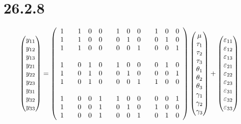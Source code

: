 \section*{26.2.8}
$$\left(\begin{matrix}
y_{11}\cr
y_{12}\cr
y_{13}\cr
y_{21}\cr
y_{22}\cr
y_{23}\cr
y_{31}\cr
y_{32}\cr
y_{33}
\end{matrix}\right)=\left(\begin{array}{ccccccccccccc}
1 && 1 & 0 & 0 && 1 & 0 & 0 && 1 & 0 & 0\cr
1 && 1 & 0 & 0 && 0 & 1 & 0 && 0 & 1 & 0\cr
1 && 1 & 0 & 0 && 0 & 0 & 1 && 0 & 0 & 1\cr
\cr
1 && 0 & 1 & 0 && 1 & 0 & 0 && 0 & 1 & 0\cr
1 && 0 & 1 & 0 && 0 & 1 & 0 && 0 & 0 & 1\cr
1 && 0 & 1 & 0 && 0 & 0 & 1 && 1 & 0 & 0\cr
\cr
1 && 0 & 0 & 1 && 1 & 0 & 0 && 0 & 0 & 1\cr
1 && 0 & 0 & 1 && 0 & 1 & 0 && 1 & 0 & 0\cr
1 && 0 & 0 & 1 && 0 & 0 & 1 && 0 & 1 & 0\cr
\end{array}\right)\left(\begin{matrix}
\mu\cr
\tau_1\cr
\tau_2\cr
\tau_3\cr
\theta_1\cr
\theta_2\cr
\theta_3\cr
\gamma_1\cr
\gamma_2\cr
\gamma_3
\end{matrix}\right)+\left(\begin{matrix}
\varepsilon_{11}\cr
\varepsilon_{12}\cr
\varepsilon_{13}\cr
\varepsilon_{21}\cr
\varepsilon_{22}\cr
\varepsilon_{23}\cr
\varepsilon_{31}\cr
\varepsilon_{32}\cr
\varepsilon_{33}
\end{matrix}\right)
$$
